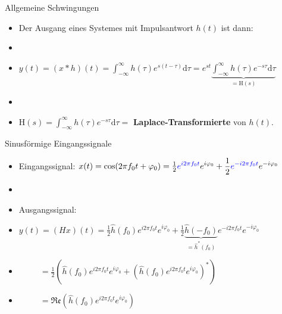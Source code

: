 \documentclass[14pt, aspectratio=169, handout]{beamer}
\begin{document}
\begin{frame}{Allgemeine Schwingungen}
    \begin{itemize}
        \item Der Ausgang eines Systemes mit Impulsantwort $h(t)$ ist dann:
        \item[] 
        \item[] $y(t) = (x \ast h)(t) = \displaystyle\int_{-\infty}^{\infty} h(\tau)e^{s(t-\tau)} \text{d}\tau = e^{st} \underbrace{\int_{-\infty}^{\infty} h(\tau) e^{-s\tau} \text{d}\tau}_{=\text{H}(s)}$
        \item[] 
        \item[] $\text{H}(s) = \displaystyle\int_{-\infty}^{\infty} h(\tau) e^{-s\tau} \text{d}\tau=$ \textbf{Laplace-Transformierte} von $h(t)$.
    \end{itemize}
\end{frame}

\begin{frame}{Sinusförmige Eingangssignale}
    \begin{itemize}
    \item Eingangssignal: $x(t) = \cos(2 \pi f_0 t + \varphi_0) = \frac{1}{2} \displaystyle \textcolor{myblue}{e^{i 2 \pi f_0 t}} e^{i \varphi_0} + \frac{1}{2} \displaystyle \textcolor{myblue}{e^{-i 2 \pi f_0 t}} e^{-i \varphi_0}$
    \item[] 
    \item[] Ausgangssignal:
    \item[] $y(t) = (Hx)(t) = \frac{1}{2}\hat{h}(f_0)\displaystyle e^{i 2 \pi f_0 t} e^{i \varphi_0} + \frac{1}{2}\underbrace{\hat{h}(-f_0)}_{=\hat{h}^\ast (f_0)}e^{-i 2 \pi f_0 t} e^{-i \varphi_0}$
    \item[] $\hspace{30pt} = \frac{1}{2}\left(\hat{h}(f_0)e^{i 2 \pi f_0 t} e^{i \varphi_0} + \left(\hat{h}(f_0)e^{i 2 \pi f_0 t} \displaystyle e^{i \varphi_0}\right)^{\ast}\right)$
    \item[] $\hspace{30pt} = \displaystyle\mathfrak{Re}\left(  \hat{h}(f_0) e^{i 2 \pi f_0 t} e^{i \varphi_0} \right)$
    \end{itemize}
\end{frame}
\end{document}
